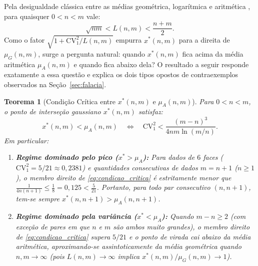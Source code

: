 \documentclass[11pt,a4paper]{article}
\newtheorem{theorem}{Teorema}[section]
\theoremstyle{definition}
\theoremstyle{remark}
\begin{document}
Pela desigualdade clássica entre as médias geométrica, logarítmica e aritmética \cite{carlson1972,lin1974}, para quaisquer $0 < n < m$ vale:
\begin{equation}
\sqrt{nm} < L(n, m) < \frac{n + m}{2}.
\label{eq:desigualdade_medias}
\end{equation}
Como o fator $\sqrt{1 + \mathrm{CV}_1^2 / L(n,m)}$ empurra $x^*(n,m)$ para a direita de $\mu_G(n,m)$, surge a pergunta natural: quando $x^*(n,m)$ fica acima da média aritmética $\mu_A(n,m)$ e quando fica abaixo dela? O resultado a seguir responde exatamente a essa questão e explica os dois tipos opostos de contraexemplos observados na Seção~\ref{sec:falacia}.

\begin{theorem}[Condição Crítica entre $x^*(n,m)$ e $\mu_A(n,m)$]
\label{thm:condicao_critica}
Para $0 < n < m$, o ponto de interseção gaussiano $x^*(n,m)$ satisfaz:
\begin{equation}
x^*(n, m) < \mu_A(n, m)
\quad \Longleftrightarrow \quad
\mathrm{CV}_1^2 < \frac{(m - n)^3}{4 n m \ln(m/n)}.
\label{eq:condicao_critica}
\end{equation}
Em particular:
\begin{enumerate}[label=(\roman*), topsep=0.2em, itemsep=0.15em]
    \item \textbf{Regime dominado pelo pico ($x^* > \mu_A$):} Para dados de $6$ faces ($\mathrm{CV}_1^2 = 5/21 \approx 0{,}2381$) e quantidades consecutivas de dados $m = n + 1$ ($n \ge 1$), o membro direito de \eqref{eq:condicao_critica} é estritamente menor que $\frac{1}{4n(n+1)} \le \frac{1}{8} = 0{,}125 < \frac{5}{21}$. Portanto, para todo par consecutivo $(n, n+1)$, tem-se sempre $x^*(n, n+1) > \mu_A(n, n+1)$.
    \item \textbf{Regime dominado pela variância ($x^* < \mu_A$):} Quando $m - n \ge 2$ (com exceção de pares em que $n$ e $m$ são ambos muito grandes), o membro direito de \eqref{eq:condicao_critica} supera $5/21$ e o ponto de virada cai abaixo da média aritmética, aproximando-se assintoticamente da média geométrica quando $n, m \to \infty$ (pois $L(n,m) \to \infty$ implica $x^*(n,m) / \mu_G(n,m) \to 1$).
\end{enumerate}
\end{theorem}
\end{document}
